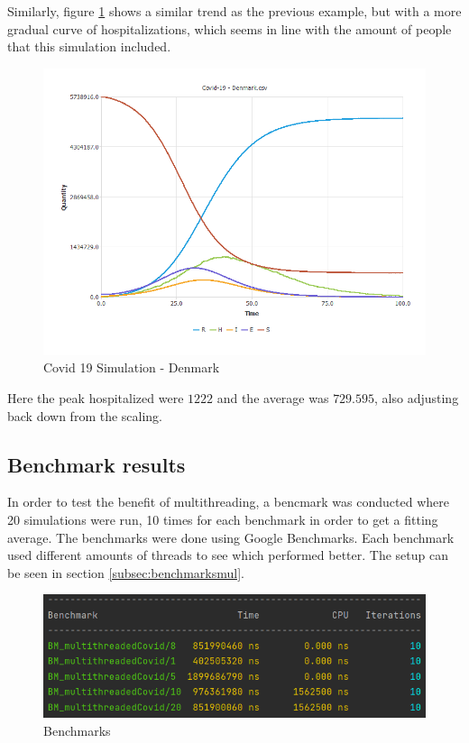 Similarly, figure \ref{fig:Denmark} shows a similar trend as the previous example, but with a more gradual curve of hospitalizations, which seems in line with the amount of people that this simulation included.

\begin{figure}[h!]
	\includegraphics[scale=0.6]{images/Covid-19 - Denmark.csv.png}
	\centering
	\caption{Covid 19 Simulation - Denmark}
	\label{fig:Denmark}
\end{figure}

Here the peak hospitalized were $1222$ and the average was $729.595$, also adjusting back down from the scaling.


\subsection{Benchmark results}
In order to test the benefit of multithreading, a bencmark was conducted where 20 simulations were run, 10 times for each benchmark in order to get a fitting average. 
The benchmarks were done using Google Benchmarks.
Each benchmark used different amounts of threads to see which performed better. 
The setup can be seen in section \ref{subsec:benchmarksmul}.

\begin{figure}[h!]
	\includegraphics[scale=0.6]{images/BenchmarkResults.png}
	\centering
	\caption{Benchmarks}
	\label{fig:Benchmarks}
\end{figure}

